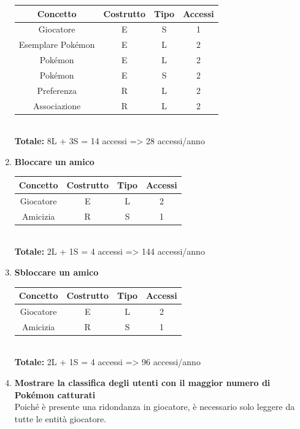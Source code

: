 \documentclass[a4paper,12pt]{report}
\begin{document}
\begin{enumerate}
  \begin{tabular}{|c|c|c|c|}
    \hline
    \rowcolor{gray!30}Concetto & Costrutto & Tipo & Accessi \\
    \hline
    Giocatore & E & S & 1 \\
    \hline
    Esemplare Pokémon & E & L & 2 \\
    \hline
    Pokémon & E & L & 2 \\
    \hline
    Pokémon & E & S & 2 \\
    \hline
    Preferenza & R & L & 2 \\
    \hline
    Associazione & R & L & 2 \\
    \hline
  \end{tabular} \\
  
  \textbf{Totale:} 8L + 3S = 14 accessi => 28 accessi/anno
  
  \item \textbf{Bloccare un amico}
  
  \begin{tabular}{|c|c|c|c|}
  	\hline
  	\rowcolor{gray!30}Concetto & Costrutto & Tipo & Accessi \\
  	\hline
    Giocatore & E & L & 2 \\
    \hline
    Amicizia & R & S & 1 \\
    \hline
  \end{tabular} \\
  
  \textbf{Totale:} 2L + 1S = 4 accessi => 144 accessi/anno
  
  \item \textbf{Sbloccare un amico}
  
  \begin{tabular}{|c|c|c|c|}
  	\hline
  	\rowcolor{gray!30}Concetto & Costrutto & Tipo & Accessi \\
  	\hline
    Giocatore & E & L & 2 \\
    \hline
    Amicizia & R & S & 1 \\
    \hline
  \end{tabular} \\
  
  \textbf{Totale:} 2L + 1S = 4 accessi => 96 accessi/anno
  
  \item \textbf{Mostrare la classifica degli utenti con il maggior numero di Pokémon catturati} \\
  Poiché è presente una ridondanza in giocatore, è necessario solo leggere da tutte le entità giocatore.
  

\end{enumerate}
\end{document}
